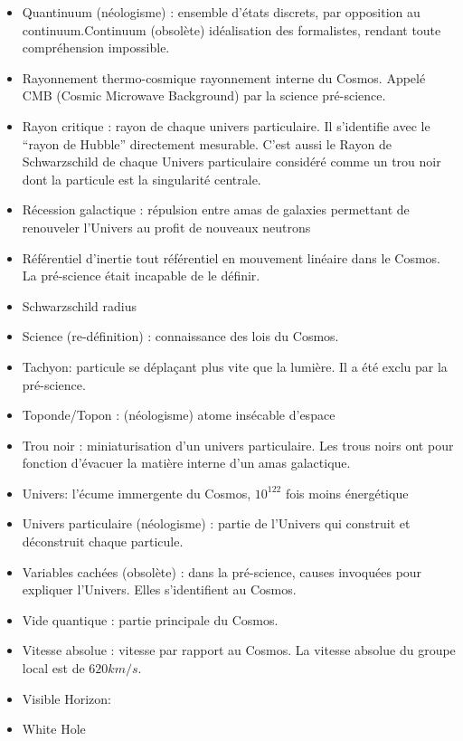 \documentclass[a4paper,12pt]{article}
\begin{document}
\begin{appendix}
\begin{itemize}
\item Quantinuum (néologisme) : ensemble d’états discrets, par opposition au continuum.Continuum (obsolète) idéalisation des formalistes, rendant toute compréhension impossible.
\item Rayonnement thermo-cosmique rayonnement interne du Cosmos. Appelé CMB (Cosmic Microwave Background) par la science pré-science.
\item Rayon critique : rayon de chaque univers particulaire. Il s’identifie avec le ``rayon de Hubble'' directement mesurable. C’est aussi le Rayon de Schwarzschild de chaque Univers particulaire considéré comme un trou noir dont la particule est la singularité centrale.
\item Récession galactique : répulsion entre amas de galaxies permettant de renouveler l’Univers au profit de nouveaux neutrons
\item Référentiel d’inertie tout référentiel en mouvement linéaire dans le Cosmos. La pré-science était incapable de le définir.
\item Schwarzschild radius
\item Science (re-définition) : connaissance des lois du Cosmos.
\item Tachyon: particule se déplaçant plus vite que la lumière. Il a été exclu par la pré-science.
\item Toponde/Topon : (néologisme) atome insécable d’espace
\item Trou noir : miniaturisation d’un univers particulaire. Les trous noirs ont pour fonction d’évacuer la matière interne d’un amas galactique.
\item Univers: l'écume immergente du Cosmos, $10^{122}$ fois moins énergétique
\item Univers particulaire (néologisme) : partie de l’Univers qui construit et déconstruit chaque particule.
\item Variables cachées (obsolète) : dans la pré-science, causes invoquées pour expliquer l’Univers. Elles s’identifient au Cosmos.
\item Vide quantique : partie principale du Cosmos.
\item Vitesse absolue : vitesse par rapport au Cosmos. La vitesse absolue du groupe local est de $620 km/s$.
\item Visible Horizon:
\item White Hole
\end{itemize}


\listoftables{}   %
\listoffigures{}



\end{appendix}
\end{document}
